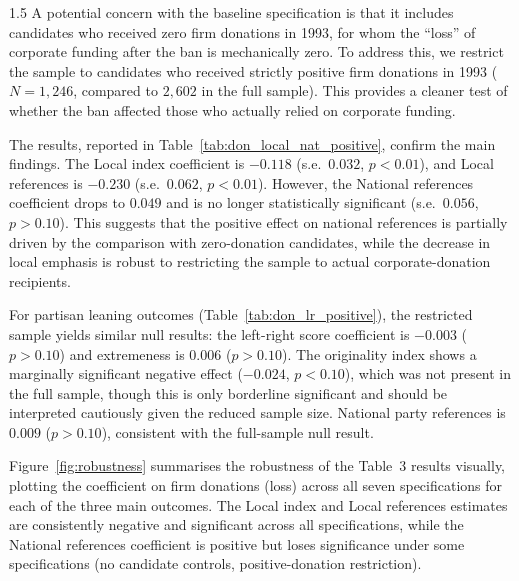 \documentclass[12pt,a4paper]{article}
\begin{document}
\begin{spacing}{1.5}
A potential concern with the baseline specification is that it includes candidates who received zero firm donations in 1993, for whom the ``loss'' of corporate funding after the ban is mechanically zero. To address this, we restrict the sample to candidates who received strictly positive firm donations in 1993 ($N=1{,}246$, compared to $2{,}602$ in the full sample). This provides a cleaner test of whether the ban affected those who actually relied on corporate funding.

The results, reported in Table~\ref{tab:don_local_nat_positive}, confirm the main findings. The Local index coefficient is $-0.118$ (s.e.\ $0.032$, $p<0.01$), and Local references is $-0.230$ (s.e.\ $0.062$, $p<0.01$). However, the National references coefficient drops to $0.049$ and is no longer statistically significant (s.e.\ $0.056$, $p>0.10$). This suggests that the positive effect on national references is partially driven by the comparison with zero-donation candidates, while the decrease in local emphasis is robust to restricting the sample to actual corporate-donation recipients.

For partisan leaning outcomes (Table~\ref{tab:don_lr_positive}), the restricted sample yields similar null results: the left-right score coefficient is $-0.003$ ($p>0.10$) and extremeness is $0.006$ ($p>0.10$). The originality index shows a marginally significant negative effect ($-0.024$, $p<0.10$), which was not present in the full sample, though this is only borderline significant and should be interpreted cautiously given the reduced sample size. National party references is $0.009$ ($p>0.10$), consistent with the full-sample null result.

\medskip
Figure~\ref{fig:robustness} summarises the robustness of the Table~3 results visually, plotting the coefficient on firm donations (loss) across all seven specifications for each of the three main outcomes. The Local index and Local references estimates are consistently negative and significant across all specifications, while the National references coefficient is positive but loses significance under some specifications (no candidate controls, positive-donation restriction).

\end{spacing}
\end{document}
